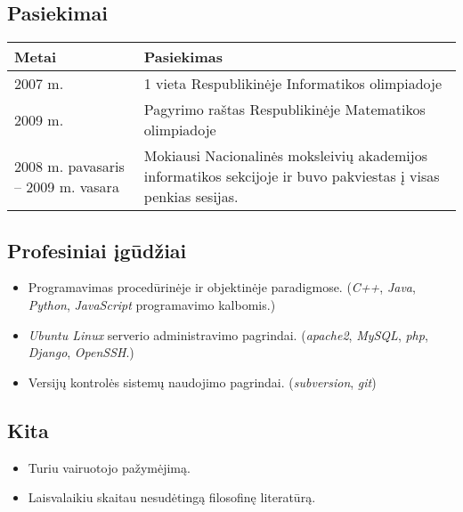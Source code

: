 \subsection{Pasiekimai}

\begin{tabular}[]{p{3cm} | p{8cm}}
  Metai & Pasiekimas \\
  \hline
  2007 m. & 1 vieta Respublikinėje Informatikos olimpiadoje \\
  2009 m. & Pagyrimo raštas Respublikinėje Matematikos olimpiadoje \\
  2008 m. pavasaris – 2009 m. vasara & Mokiausi Nacionalinės moksleivių
  akademijos informatikos sekcijoje ir buvo pakviestas į visas penkias
  sesijas. 
\end{tabular}

\subsection{Profesiniai įgūdžiai}

\begin{itemize}
  \item Programavimas procedūrinėje ir objektinėje paradigmose. 
    (\emph{C++}, \emph{Java}, \emph{Python}, \emph{JavaScript} 
    programavimo kalbomis.)
  \item \emph{Ubuntu Linux} serverio administravimo pagrindai. 
    (\emph{apache2}, \emph{MySQL}, \emph{php}, \emph{Django}, 
    \emph{OpenSSH}.)
  \item Versijų kontrolės sistemų naudojimo pagrindai. 
    (\emph{subversion}, \emph{git})
\end{itemize}

\subsection{Kita}

\begin{itemize}
  \item Turiu vairuotojo pažymėjimą.
  \item Laisvalaikiu skaitau nesudėtingą filosofinę literatūrą.
\end{itemize}
